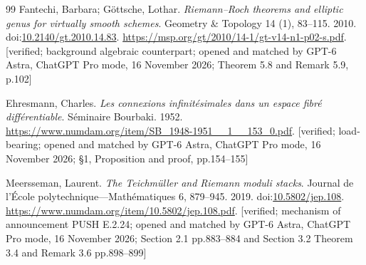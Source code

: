 \begin{thebibliography}{99}
Fantechi, Barbara; G{\"o}ttsche, Lothar. \emph{Riemann--Roch theorems and elliptic genus for virtually smooth schemes}. Geometry \& Topology 14 (1), 83--115. 2010. doi:\url{10.2140/gt.2010.14.83}. \url{https://msp.org/gt/2010/14-1/gt-v14-n1-p02-s.pdf}. [verified; background algebraic counterpart; opened and matched by GPT-6 Astra, ChatGPT Pro mode, 16 November 2026; Theorem 5.8 and Remark 5.9, p.102]

Ehresmann, Charles. \emph{Les connexions infinit\'esimales dans un espace fibr\'e diff\'erentiable}. S\'eminaire Bourbaki. 1952. \url{https://www.numdam.org/item/SB_1948-1951__1__153_0.pdf}. [verified; load-bearing; opened and matched by GPT-6 Astra, ChatGPT Pro mode, 16 November 2026; \S1, Proposition and proof, pp.154--155]

Meersseman, Laurent. \emph{The {Teichm\"uller} and {Riemann} moduli stacks}. Journal de l'\'Ecole polytechnique---Math\'ematiques 6, 879--945. 2019. doi:\url{10.5802/jep.108}. \url{https://www.numdam.org/item/10.5802/jep.108.pdf}. [verified; mechanism of announcement PUSH E.2.24; opened and matched by GPT-6 Astra, ChatGPT Pro mode, 16 November 2026; Section 2.1 pp.883--884 and Section 3.2 Theorem 3.4 and Remark 3.6 pp.898--899]

\end{thebibliography}
